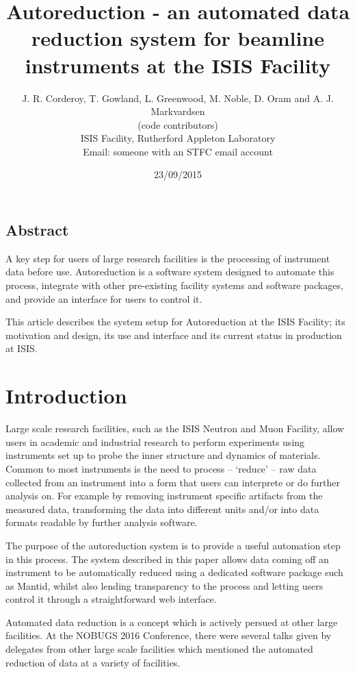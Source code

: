 \documentclass[twocolumn]{article}
\title{\textbf{Autoreduction - an automated data reduction system for beamline instruments at the ISIS Facility}}
\author{J. R. Corderoy, T. Gowland, L. Greenwood, M. Noble, D. Oram and A. J. Markvardsen \\
(code contributors)\\
ISIS Facility, Rutherford Appleton Laboratory\\
Email: someone with an STFC email account}
\date{23/09/2015}
\begin{document}
\maketitle

\subsection*{Abstract}\label{abstract}

A key step for users of large research facilities is the
processing of instrument data before use. Autoreduction is a software
system designed to automate this process, integrate with other
pre-existing facility systems and software packages, and provide
an interface for users to control it.

This article describes the system setup for Autoreduction at the ISIS Facility;
its motivation and design, its use and interface and its current status in production at ISIS.

\section{Introduction}\label{introduction}

Large scale research facilities, such as the ISIS Neutron and Muon
Facility, allow users in academic and industrial research
to perform experiments using instruments set up to probe the inner 
structure and dynamics of materials. 
Common to most instruments is the need to process -- 
`reduce' -- raw data collected from an instrument into a form
that users can interprete or do further analysis on. For example
by removing instrument specific artifacts from the measured data, 
transforming the data into different units and/or
into data formats readable by further analysis software.

The purpose of the autoreduction system is to provide a useful automation
step in this process. The system described in this paper allows data coming 
off an instrument to be automatically reduced using a dedicated software package 
such as Mantid\cite{mantid}, whilst also lending transparency to the process and
letting users control it through a straightforward web interface.

Automated data reduction is a concept which is actively persued at other large facilities.
At the NOBUGS 2016 Conference\cite{NOBUGS}, there were several talks given by delegates
from other large scale facilities which mentioned the automated reduction of data at a variety
of facilities. 
\end{document}
